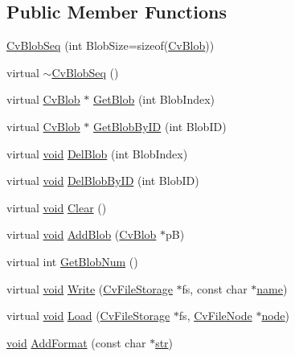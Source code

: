 \subsection*{Public Member Functions}
\begin{DoxyCompactItemize}
\item 
\hyperlink{classCvBlobSeq_af7cecea9c0fa2df884401478522ce886}{Cv\-Blob\-Seq} (int Blob\-Size=sizeof(\hyperlink{structCvBlob}{Cv\-Blob}))
\item 
virtual \hyperlink{classCvBlobSeq_a733493a2001dbcaac281bde538054d50}{$\sim$\-Cv\-Blob\-Seq} ()
\item 
virtual \hyperlink{structCvBlob}{Cv\-Blob} $\ast$ \hyperlink{classCvBlobSeq_a05334c9dadb532d41462af5370fbcf4a}{Get\-Blob} (int Blob\-Index)
\item 
virtual \hyperlink{structCvBlob}{Cv\-Blob} $\ast$ \hyperlink{classCvBlobSeq_aeeb2faa5984e48efc14c564a6cca3b16}{Get\-Blob\-By\-I\-D} (int Blob\-I\-D)
\item 
virtual \hyperlink{legacy_8hpp_a8bb47f092d473522721002c86c13b94e}{void} \hyperlink{classCvBlobSeq_a4ade71edad76c40a29b397bfe69eb6b6}{Del\-Blob} (int Blob\-Index)
\item 
virtual \hyperlink{legacy_8hpp_a8bb47f092d473522721002c86c13b94e}{void} \hyperlink{classCvBlobSeq_a4115e3271b9575820049817ca8169b10}{Del\-Blob\-By\-I\-D} (int Blob\-I\-D)
\item 
virtual \hyperlink{legacy_8hpp_a8bb47f092d473522721002c86c13b94e}{void} \hyperlink{classCvBlobSeq_a26273e98ef6a3c203bb754202aa53ae8}{Clear} ()
\item 
virtual \hyperlink{legacy_8hpp_a8bb47f092d473522721002c86c13b94e}{void} \hyperlink{classCvBlobSeq_a0fe3f9e1b437770598b240ccf6091729}{Add\-Blob} (\hyperlink{structCvBlob}{Cv\-Blob} $\ast$p\-B)
\item 
virtual int \hyperlink{classCvBlobSeq_a97ac39411f5d16fe848bac88076eed16}{Get\-Blob\-Num} ()
\item 
virtual \hyperlink{legacy_8hpp_a8bb47f092d473522721002c86c13b94e}{void} \hyperlink{classCvBlobSeq_a0c10ccbf79e488a7225523ade2a9c2af}{Write} (\hyperlink{core_2types__c_8h_a84556d1bb6f1b8b02c04c60246747a7e}{Cv\-File\-Storage} $\ast$fs, const char $\ast$\hyperlink{core__c_8h_add928d8eb85ea33a25a67db3406d4887}{name})
\item 
virtual \hyperlink{legacy_8hpp_a8bb47f092d473522721002c86c13b94e}{void} \hyperlink{classCvBlobSeq_a8382aa8369fbd20bc23e72ef20443e2f}{Load} (\hyperlink{core_2types__c_8h_a84556d1bb6f1b8b02c04c60246747a7e}{Cv\-File\-Storage} $\ast$fs, \hyperlink{structCvFileNode}{Cv\-File\-Node} $\ast$\hyperlink{core__c_8h_a4e145da43d8cadc65b69ce0c2a2cc76a}{node})
\item 
\hyperlink{legacy_8hpp_a8bb47f092d473522721002c86c13b94e}{void} \hyperlink{classCvBlobSeq_ab99a470ade8c124b62f7acd253d5f0dc}{Add\-Format} (const char $\ast$\hyperlink{core__c_8h_a5f3a65d240411b0018990ff992b348c0}{str})
\end{DoxyCompactItemize}
